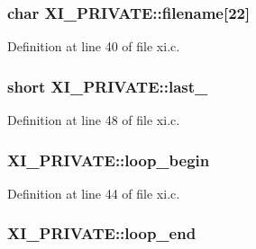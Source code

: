 \subsubsection[{\texorpdfstring{filename}{filename}}]{\setlength{\rightskip}{0pt plus 5cm}char X\+I\+\_\+\+P\+R\+I\+V\+A\+T\+E\+::filename\mbox{[}22\mbox{]}}\hypertarget{struct_x_i___p_r_i_v_a_t_e_a41df2b0ee43686ada53d4b7358549cf0}{}\label{struct_x_i___p_r_i_v_a_t_e_a41df2b0ee43686ada53d4b7358549cf0}


Definition at line 40 of file xi.\+c.

\subsubsection[{\texorpdfstring{last\+\_\+16}{last_16}}]{\setlength{\rightskip}{0pt plus 5cm}short X\+I\+\_\+\+P\+R\+I\+V\+A\+T\+E\+::last\+\_}\hypertarget{struct_x_i___p_r_i_v_a_t_e_abc466cf0cd59d2a3a148ad66c2a15b07}{}\label{struct_x_i___p_r_i_v_a_t_e_abc466cf0cd59d2a3a148ad66c2a15b07}


Definition at line 48 of file xi.\+c.

\subsubsection[{\texorpdfstring{loop\+\_\+begin}{loop_begin}}]{ X\+I\+\_\+\+P\+R\+I\+V\+A\+T\+E\+::loop\+\_\+begin}\hypertarget{struct_x_i___p_r_i_v_a_t_e_a0dbacd051afcb9023d4e4697332b1920}{}\label{struct_x_i___p_r_i_v_a_t_e_a0dbacd051afcb9023d4e4697332b1920}


Definition at line 44 of file xi.\+c.

\subsubsection[{\texorpdfstring{loop\+\_\+end}{loop_end}}]{ X\+I\+\_\+\+P\+R\+I\+V\+A\+T\+E\+::loop\+\_\+end}\hypertarget{struct_x_i___p_r_i_v_a_t_e_a9a68573bd1231a7ae0f0c63cb2aa686e}{}\label{struct_x_i___p_r_i_v_a_t_e_a9a68573bd1231a7ae0f0c63cb2aa686e}


